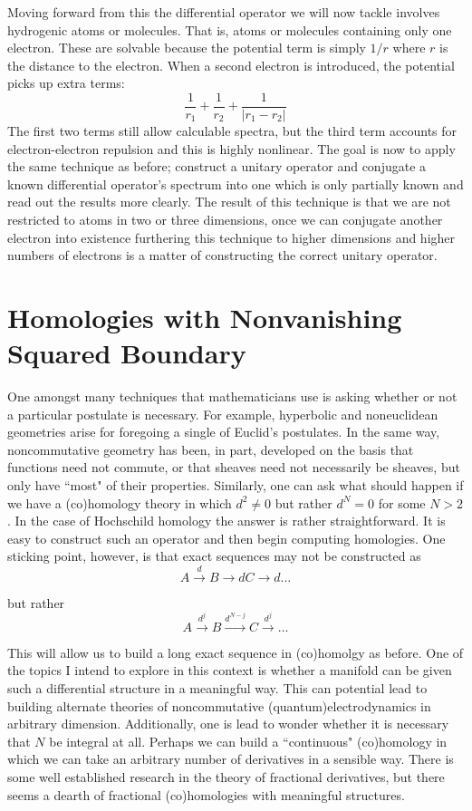 \documentclass[10 pt]{amsart}
\theoremstyle{definition}
\theoremstyle{remark}
\numberwithin{equation}{subsection}
\begin{document}
\indent Moving forward from this the differential operator we will now tackle involves hydrogenic atoms or molecules.  That is, atoms or molecules containing only one electron.  These are solvable because the potential term is simply $1/r$ where $r$ is the distance to the electron.  When a second electron is introduced, the potential picks up extra terms:
\[
\frac{1}{r_1} + \frac{1}{r_2} + \frac{1}{|r_1-r_2|}
\]
The first two terms still allow calculable spectra, but the third term accounts for electron-electron repulsion and this is highly nonlinear.  The goal is now to apply the same technique as before; construct a unitary operator and conjugate a known differential operator's spectrum into one which is only partially known and read out the results more clearly.  The result of this technique is that we are not restricted to atoms in two or three dimensions, once we can conjugate another electron into existence furthering this technique to higher dimensions and higher numbers of electrons is a matter of constructing the correct unitary operator.  

\section*{Homologies with Nonvanishing Squared Boundary}

One amongst many techniques that mathematicians use is asking whether or not a particular postulate is necessary.  For example, hyperbolic and noneuclidean geometries arise for foregoing a single of Euclid's postulates.  In the same way, noncommutative geometry has been, in part, developed on the basis that functions need not commute, or that sheaves need not necessarily be sheaves, but only have ``most" of their properties.  Similarly, one can ask what should happen if we have a (co)homology theory in which $d^2 \ne 0$ but rather $d^N = 0$ for some $N>2$.  In the case of Hochschild homology the answer is rather straightforward.  It is easy to construct such an operator and then begin computing homologies.  One sticking point, however, is that exact sequences may not be constructed as
\[
A \xrightarrow{d} B \rightarrow{d} C \rightarrow{d} \dots
\]

but rather 
\[
A \xrightarrow{d^j} B \xrightarrow{d^{N-j}} C \xrightarrow{d^j} \dots
\]

This will allow us to build a long exact sequence in (co)homolgy as before.  One of the topics I intend to explore in this context is whether a manifold can be given such a differential structure in a meaningful way.  This can potential lead to building alternate theories of noncommutative (quantum)electrodynamics in arbitrary dimension.  Additionally, one is lead to wonder whether it is necessary that $N$ be integral at all.  Perhaps we can build a ``continuous" (co)homology in which we can take an arbitrary number of derivatives in a sensible way.  There is some well established research in the theory of fractional derivatives, but there seems a dearth of fractional (co)homologies with meaningful structures.
\end{document}
